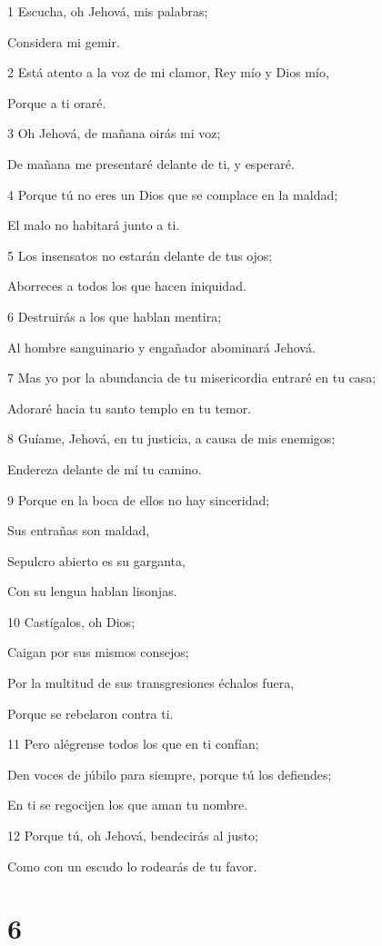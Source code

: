 \par 1 Escucha, oh Jehová, mis palabras;
\par Considera mi gemir.
\par 2 Está atento a la voz de mi clamor, Rey mío y Dios mío,
\par Porque a ti oraré.
\par 3 Oh Jehová, de mañana oirás mi voz;
\par De mañana me presentaré delante de ti, y esperaré.
\par 4 Porque tú no eres un Dios que se complace en la maldad;
\par El malo no habitará junto a ti.
\par 5 Los insensatos no estarán delante de tus ojos;
\par Aborreces a todos los que hacen iniquidad.
\par 6 Destruirás a los que hablan mentira;
\par Al hombre sanguinario y engañador abominará Jehová.
\par 7 Mas yo por la abundancia de tu misericordia entraré en tu casa;
\par Adoraré hacia tu santo templo en tu temor.
\par 8 Guíame, Jehová, en tu justicia, a causa de mis enemigos;
\par Endereza delante de mí tu camino.
\par 9 Porque en la boca de ellos no hay sinceridad;
\par Sus entrañas son maldad,
\par Sepulcro abierto es su garganta,
\par Con su lengua hablan lisonjas.
\par 10 Castígalos, oh Dios;
\par Caigan por sus mismos consejos;
\par Por la multitud de sus transgresiones échalos fuera,
\par Porque se rebelaron contra ti.
\par 11 Pero alégrense todos los que en ti confían;
\par Den voces de júbilo para siempre, porque tú los defiendes;
\par En ti se regocijen los que aman tu nombre.
\par 12 Porque tú, oh Jehová, bendecirás al justo;
\par Como con un escudo lo rodearás de tu favor.

\chapter{6}

